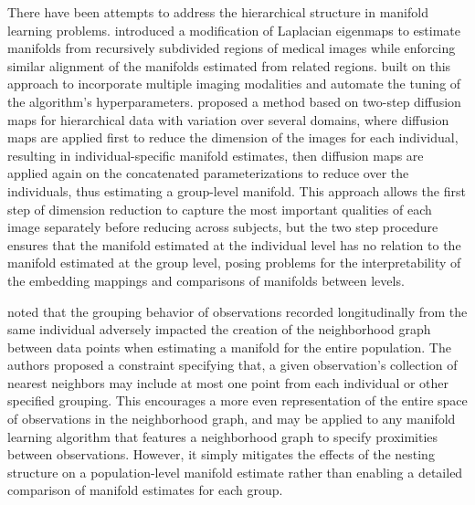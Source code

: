 \documentclass[11pt,reqno]{article}
\theoremstyle{definition}
\begin{document}
There have been attempts to address the hierarchical structure in manifold learning problems. \cite{bhatiaHierarchicalManifoldLearning2012} introduced a modification of Laplacian eigenmaps to estimate manifolds from recursively subdivided regions of medical images while enforcing similar alignment of the manifolds estimated from related regions. \cite{freicheCharacterizingMyocardialIschemia2022} built on this approach to incorporate multiple imaging modalities and automate the tuning of the algorithm's hyperparameters. \cite{gaoHierarchicalManifoldLearning2019} proposed a method based on two-step diffusion maps for hierarchical data with variation over several domains, where diffusion maps are applied first to reduce the dimension of the images for each individual, resulting in individual-specific manifold estimates, then diffusion maps are applied again on the concatenated parameterizations to reduce over the individuals, thus estimating a group-level manifold. This approach allows the first step of dimension reduction to capture the most important qualities of each image separately before reducing across subjects, but the two step procedure ensures that the manifold estimated at the individual level has no relation to the manifold estimated at the group level, posing problems for the interpretability of the embedding mappings and comparisons of manifolds between levels.

\cite{guerreroGroupconstrainedManifoldLearning2017} noted that the grouping behavior of observations recorded longitudinally from the same individual adversely impacted the creation of the neighborhood graph between data points when estimating a manifold for the entire population. The authors proposed a constraint specifying that, a given observation's collection of nearest neighbors may include at most one point from each individual or other specified grouping. This encourages a more even representation of the entire space of observations in the neighborhood graph, and may be applied to any manifold learning algorithm that features a neighborhood graph to specify proximities between observations. However, it simply mitigates the effects of the nesting structure on a population-level manifold estimate rather than enabling a detailed comparison of manifold estimates for each group.
\end{document}
